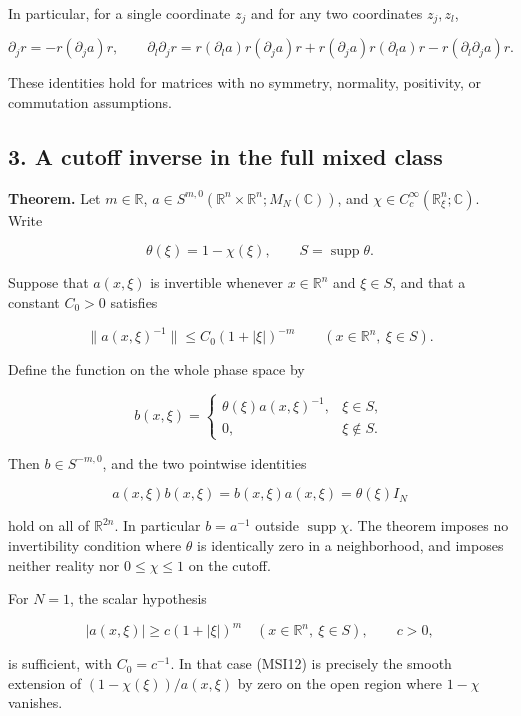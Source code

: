 \documentclass[
  11pt,
]{article}
\begin{document}
In particular, for a single coordinate \(z_j\) and for any two
coordinates \(z_j,z_l\),

\[
\partial_jr=-r(\partial_ja)r,
\qquad
\partial_l\partial_jr
=r(\partial_la)r(\partial_ja)r
 +r(\partial_ja)r(\partial_la)r
 -r(\partial_l\partial_ja)r.
\tag{MSI9}
\]

These identities hold for matrices with no symmetry, normality,
positivity, or commutation assumptions.

\subsection{3. A cutoff inverse in the full mixed
class}\label{a-cutoff-inverse-in-the-full-mixed-class}

\textbf{Theorem.} Let \(m\in\mathbb R\),
\(a\in S^{m,0}(\mathbb R^n\times\mathbb R^n;M_N(\mathbb C))\), and
\(\chi\in C_c^\infty(\mathbb R_\xi^n;\mathbb C)\). Write

\[
\theta(\xi)=1-\chi(\xi),\qquad
S=\operatorname{supp}\theta.
\tag{MSI10}
\]

Suppose that \(a(x,\xi)\) is invertible whenever \(x\in\mathbb R^n\) and
\(\xi\in S\), and that a constant \(C_0>0\) satisfies

\[
\|a(x,\xi)^{-1}\|
\leq C_0(1+|\xi|)^{-m}
\qquad (x\in\mathbb R^n,\ \xi\in S).
\tag{MSI11}
\]

Define the function on the whole phase space by

\[
b(x,\xi)=
\begin{cases}
\theta(\xi)a(x,\xi)^{-1},&\xi\in S,\\
0,&\xi\notin S.
\end{cases}
\tag{MSI12}
\]

Then \(b\in S^{-m,0}\), and the two pointwise identities

\[
a(x,\xi)b(x,\xi)=b(x,\xi)a(x,\xi)
=\theta(\xi)I_N
\tag{MSI13}
\]

hold on all of \(\mathbb R^{2n}\). In particular \(b=a^{-1}\) outside
\(\operatorname{supp}\chi\). The theorem imposes no invertibility
condition where \(\theta\) is identically zero in a neighborhood, and
imposes neither reality nor \(0\leq\chi\leq1\) on the cutoff.

For \(N=1\), the scalar hypothesis

\[
|a(x,\xi)|\geq c(1+|\xi|)^m
\quad (x\in\mathbb R^n,\ \xi\in S),\qquad c>0,
\tag{MSI14}
\]

is sufficient, with \(C_0=c^{-1}\). In that case (MSI12) is precisely
the smooth extension of \((1-\chi(\xi))/a(x,\xi)\) by zero on the open
region where \(1-\chi\) vanishes.
\end{document}
